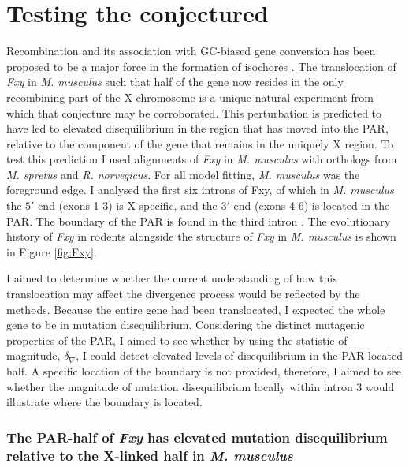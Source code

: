 \section{Testing the conjectured}

Recombination and its association with GC-biased gene conversion has been proposed to be a major force in the formation of isochores \citep{Montoya-Burgos2003RecombinationGenomes}. The translocation of \textit{Fxy} in \textit{M. musculus} such that half of the gene now resides in the only recombining part of the X chromosome is a unique natural experiment from which that conjecture may be corroborated. This perturbation is predicted to have led to elevated disequilibrium in the region that has moved into the PAR, relative to the component of the gene that remains in the uniquely X region. To test this prediction I used alignments of \textit{Fxy} in \textit{M. musculus} with orthologs from \textit{M. spretus} and \textit{R. norvegicus}. For all model fitting, \textit{M. musculus} was the foreground edge. I analysed the first six introns of Fxy, of which in \textit{M. musculus} the $5'$ end (exons 1-3) is X-specific, and the $3'$ end (exons 4-6) is located in the PAR. The boundary of the PAR is found in the third intron \citep{Palmer1997AMice}. The evolutionary history of \textit{Fxy} in rodents alongside the structure of \textit{Fxy} in \textit{M. musculus} is shown in Figure \ref{fig:Fxy}. 

I aimed to determine whether the current understanding of how this translocation may affect the divergence process would be reflected by the methods. Because the entire gene had been translocated, I expected the whole gene to be in mutation disequilibrium. Considering the distinct mutagenic properties of the PAR, I aimed to see whether by using the statistic of magnitude, $\delta_\nabla$, I could detect elevated levels of disequilibrium in the PAR-located half. A specific location of the boundary is not provided, therefore, I aimed to see whether the magnitude of mutation disequilibrium locally within intron 3 would illustrate where the boundary is located. 



\subsubsection{The PAR-half of \textit{Fxy} has elevated mutation disequilibrium relative to the X-linked half in \textit{M. musculus}}

